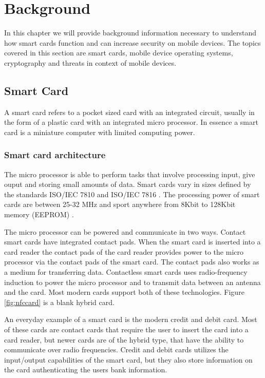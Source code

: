 \chapter{Background}
In this chapter we will provide background information necessary to understand how smart cards function and can increase security on mobile devices. The topics covered in this section are smart cards, mobile device operating systems, cryptography and threats in context of mobile devices.

\section{Smart Card}
\label{sec:smartcard}
A smart card refers to a pocket sized card with an integrated circuit, usually in the form of a plastic card with an integrated micro processor. In essence a smart card is a miniature computer with limited computing power.

\subsection{Smart card architecture}
The micro processor is able to perform tasks that involve processing input, give ouput and storing small amounts of data. Smart cards vary in sizes defined by the standards ISO/IEC 7810 \cite{iso7810} and ISO/IEC 7816 \cite{iso7816}. The processing power of smart cards are between 25-32 MHz and sport anywhere from 8Kbit to 128Kbit memory (EEPROM) \cite{cardProcessing}.

The micro processor can be powered and communicate in two ways. Contact smart cards have integrated contact pads. When the smart card is inserted into a card reader the contact pads of the card reader provides power to the micro processor via the contact pads of the smart card. The contact pads also works as a medium for transferring data. Contactless smart cards uses radio-frequency induction to power the micro processor and to transmit data between an antenna and the card. Most modern cards support both of these technologies. Figure \ref{fig:nfccard} is a blank hybrid card.

An everyday example of a smart card is the modern credit and debit card. Most of these cards are contact cards that require the user to insert the card into a card reader, but newer cards are of the hybrid type, that have the ability to communicate over radio frequencies. Credit and debit cards utilizes the input/output capabilities of the smart card, but they also store information on the card authenticating the users bank information.

